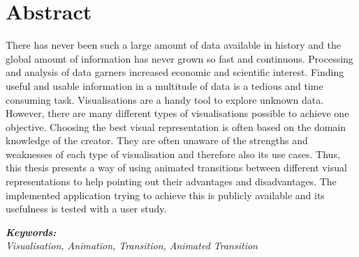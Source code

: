 \section*{Abstract}
\vspace{0.5cm}

There has never been such a large amount of data available in history and the global amount of information has never grown so fast and continuous. Processing and analysis of data garners increased economic and scientific interest. Finding useful and usable information in a multitude of data is a tedious and time consuming task. Visualisations are a handy tool to explore unknown data. However, there are many different types of visualisations possible to achieve one objective. Choosing the best visual representation is often based on the domain knowledge of the creator. They are often unaware of the strengths and weaknesses of each type of visualisation and therefore also its use cases. Thus, this thesis presents a way of using animated transitions between different visual representations to help pointing out their advantages and disadvantages. The implemented application trying to achieve this is publicly available and its usefulness is tested with a user study.

\vspace{0.5cm}
\textbf{\textit{Keywords:}} \\
\textit{Visualisation, Animation, Transition, Animated Transition}